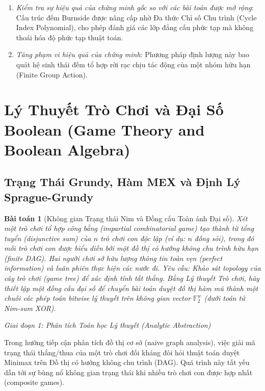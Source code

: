 \documentclass{article}
\newtheorem{baitoan}{Bài toán}
\begin{document}
\begin{enumerate}
  \item \textit{Kiểm tra sự hiệu quả của chứng minh gốc so với các bài toán được mở rộng}: Cấu trúc đếm Burnside được nâng cấp nhờ Đa thức Chỉ số Chu trình (Cycle Index Polynomial), cho phép đánh giá các lớp đẳng cấu phức tạp mà không thoái hóa độ phức tạp thuật toán.
 \item \textit{Tăng phạm vi hiệu quả của chứng minh}: Phương pháp định lượng này bao quát hệ sinh thái đếm tổ hợp rời rạc chịu tác động của một nhóm hữu hạn (Finite Group Action).
\end{enumerate}



\section{Lý Thuyết Trò Chơi và Đại Số Boolean (Game Theory and Boolean Algebra)}
\subsection{Trạng Thái Grundy, Hàm MEX và Định Lý Sprague-Grundy}

\begin{baitoan}[Không gian Trạng thái Nim và Đồng cấu Toàn ánh Đại số]
Xét một trò chơi tổ hợp công bằng (impartial combinatorial game) tạo thành từ tổng tuyển (disjunctive sum) của $n$ trò chơi con độc lập (ví dụ: $n$ đống sỏi), trong đó mỗi trò chơi con được biểu diễn bởi một đồ thị có hướng không chu trình hữu hạn (finite DAG). Hai người chơi sở hữu lượng thông tin toàn vẹn (perfect information) và luân phiên thực hiện các nước đi. Yêu cầu: Khảo sát topology của cây trò chơi (game tree) để xác định tính tất thắng. Bằng Lý thuyết Trò chơi, hãy thiết lập một đồng cấu đại số để chuyển bài toán duyệt đồ thị hàm mũ thành một chuỗi các phép toán bitwise lý thuyết trên không gian vector $\mathbb{F}_2^w$ (dưới toán tử Nim-sum XOR).
\end{baitoan}

\vspace{0.5em}\noindent\emph{Giai đoạn 1: Phân tích Toán học Lý thuyết (Analytic Abstraction)}

Trong hướng tiếp cận phân tích đồ thị cơ sở (naive graph analysis), việc giải mã trạng thái thắng/thua của một trò chơi đối kháng đòi hỏi thuật toán duyệt Minimax trên Đồ thị có hướng không chu trình (DAG). Quá trình này tất yếu dẫn tới sự bùng nổ không gian trạng thái khi nhiều trò chơi con được hợp nhất (composite games).
\end{document}
